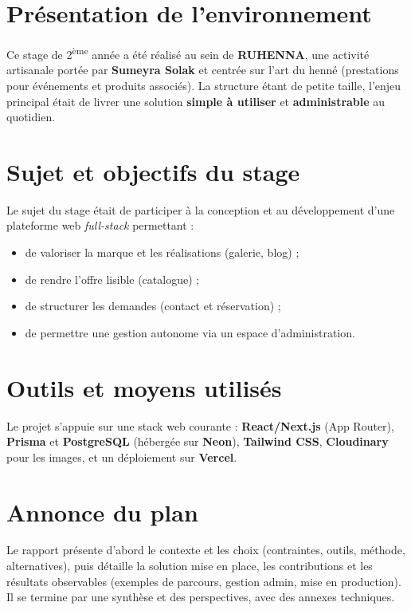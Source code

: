 \section{Présentation de l’environnement}
Ce stage de 2\textsuperscript{ème} année a été réalisé au sein de \textbf{RUHENNA}, une activité artisanale portée par \textbf{Sumeyra Solak} et centrée sur l’art du henné (prestations pour événements et produits associés). La structure étant de petite taille, l’enjeu principal était de livrer une solution \textbf{simple à utiliser} et \textbf{administrable} au quotidien.

\section{Sujet et objectifs du stage}
Le sujet du stage était de participer à la conception et au développement d’une plateforme web \textit{full-stack} permettant :
\begin{itemize}
    \item de valoriser la marque et les réalisations (galerie, blog) ;
    \item de rendre l’offre lisible (catalogue) ;
    \item de structurer les demandes (contact et réservation) ;
    \item de permettre une gestion autonome via un espace d’administration.
\end{itemize}

\section{Outils et moyens utilisés}
Le projet s’appuie sur une stack web courante : \textbf{React/Next.js} (App Router), \textbf{Prisma} et \textbf{PostgreSQL} (hébergée sur \textbf{Neon}), \textbf{Tailwind CSS}, \textbf{Cloudinary} pour les images, et un déploiement sur \textbf{Vercel}.

\section{Annonce du plan}
Le rapport présente d’abord le contexte et les choix (contraintes, outils, méthode, alternatives), puis détaille la solution mise en place, les contributions et les résultats observables (exemples de parcours, gestion admin, mise en production). Il se termine par une synthèse et des perspectives, avec des annexes techniques.

